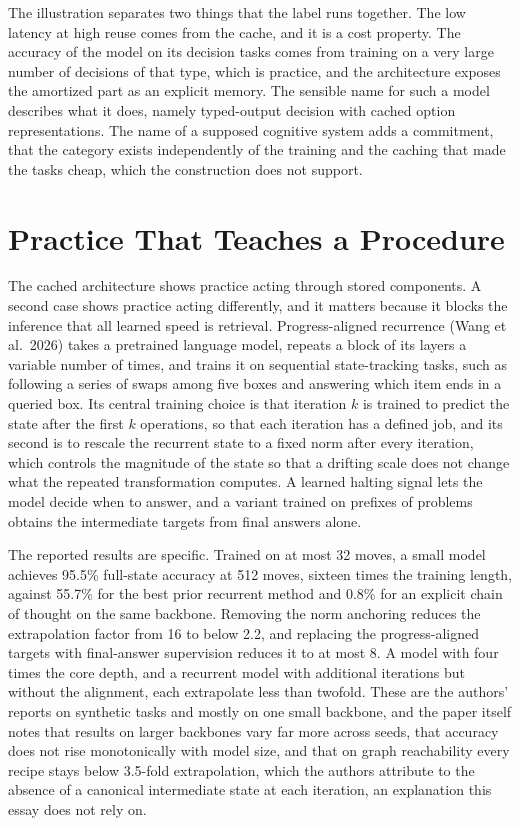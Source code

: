 \documentclass[11pt]{article}
\theoremstyle{definition}
\begin{document}
The illustration separates two things that the label runs together. The low latency at high reuse comes from the cache, and it is a cost property. The accuracy of the model on its decision tasks comes from training on a very large number of decisions of that type, which is practice, and the architecture exposes the amortized part as an explicit memory. The sensible name for such a model describes what it does, namely typed-output decision with cached option representations. The name of a supposed cognitive system adds a commitment, that the category exists independently of the training and the caching that made the tasks cheap, which the construction does not support.

\section{Practice That Teaches a Procedure}

The cached architecture shows practice acting through stored components. A second case shows practice acting differently, and it matters because it blocks the inference that all learned speed is retrieval. Progress-aligned recurrence (Wang et al.\ 2026) takes a pretrained language model, repeats a block of its layers a variable number of times, and trains it on sequential state-tracking tasks, such as following a series of swaps among five boxes and answering which item ends in a queried box. Its central training choice is that iteration $k$ is trained to predict the state after the first $k$ operations, so that each iteration has a defined job, and its second is to rescale the recurrent state to a fixed norm after every iteration, which controls the magnitude of the state so that a drifting scale does not change what the repeated transformation computes. A learned halting signal lets the model decide when to answer, and a variant trained on prefixes of problems obtains the intermediate targets from final answers alone.

The reported results are specific. Trained on at most 32 moves, a small model achieves 95.5\% full-state accuracy at 512 moves, sixteen times the training length, against 55.7\% for the best prior recurrent method and 0.8\% for an explicit chain of thought on the same backbone. Removing the norm anchoring reduces the extrapolation factor from 16 to below 2.2, and replacing the progress-aligned targets with final-answer supervision reduces it to at most 8. A model with four times the core depth, and a recurrent model with additional iterations but without the alignment, each extrapolate less than twofold. These are the authors' reports on synthetic tasks and mostly on one small backbone, and the paper itself notes that results on larger backbones vary far more across seeds, that accuracy does not rise monotonically with model size, and that on graph reachability every recipe stays below 3.5-fold extrapolation, which the authors attribute to the absence of a canonical intermediate state at each iteration, an explanation this essay does not rely on.
\end{document}
